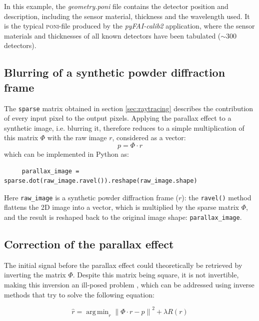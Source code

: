 \documentclass[preprint,pdf]{iucr}              %
\begin{document}
In this example, the \textit{geometry.poni} file contains the detector position and description,
including the sensor material, thickness and the wavelength used.
It is the typical \textsc{poni}-file produced by the \textit{pyFAI-calib2} application, where
the sensor materials and thicknesses of all known detectors have been tabulated ($\sim$300 detectors).

     \subsection{Blurring of a synthetic powder diffraction frame}
\label{blur}
The \texttt{sparse} matrix obtained in section \ref{sec:raytracing} describes the
contribution of every input pixel to the output pixels.
Applying the parallax effect to a synthetic image, i.e. blurring it, therefore reduces
to a simple multiplication of this matrix $\Phi$ with the raw image $r$, considered as a vector:
\begin{equation}
\label{eq:blur}
p = \Phi \cdot r
\end{equation}
which can be implemented in Python \cite{python} as:
\begin{verbatim}
     parallax_image = sparse.dot(raw_image.ravel()).reshape(raw_image.shape)
\end{verbatim}

Here \texttt{raw\_image} is a synthetic powder diffraction frame ($r$): the \texttt{ravel()}
method flattens the 2D image into a vector, which is multiplied by the sparse matrix $\Phi$,
and the result is reshaped back to the original image shape: \texttt{parallax\_image}.

     \subsection{Correction of the parallax effect}
     \label{sec:deconvolution}
     
The initial signal before the parallax effect could theoretically be retrieved by inverting the matrix $\Phi$. 
Despite this matrix being square, it is not invertible, making this inversion an ill-posed problem \cite{hadamard}, which can be addressed using inverse methods that try to solve the following equation:

\begin{equation}
\label{eq:inv}
\hat{r} = \operatorname{arg\,min}_r \left\| \Phi \cdot r - p \right\|^2 + \lambda R(r)
\end{equation}
\end{document}
